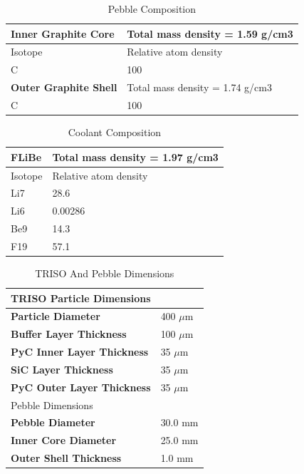 \begin{table}
  \centering
  \begin{tabular}{|ll|}
    \hline \hline
    \textbf{Inner Graphite Core}	& Total mass density = 1.59 g/cm3 \\
    \hline
    Isotope	& Relative atom density \\
    C	& 100 \\
    \hline \hline
    \textbf{Outer Graphite Shell}	& Total mass density = 1.74 g/cm3 \\
    \hline
    C	& 100 \\
    \hline \hline
  \end{tabular}
  \caption{Pebble Composition}
  \label{tab:pebble_comp}
\end{table}


\begin{table}
  \centering
  \begin{tabular}{|ll|}
    \hline \hline
    \textbf{FLiBe}	      & Total mass density = 1.97 g/cm3 \\
    \hline
    Isotope	              & Relative atom density \\
    Li7	                  & 28.6 \\
    Li6	                  & 0.00286 \\
    Be9	                  & 14.3 \\
    F19	                  & 57.1 \\
    \hline \hline
  \end{tabular}
  \caption{Coolant Composition}
  \label{tab:coolant_comp}
\end{table}

\begin{table}
  \centering
  \begin{tabular}{|ll|}
    \hline \hline
    TRISO Particle Dimensions & \\
    \hline
    \textbf{Particle Diameter}	 & 400 $\mu$m \\
    \textbf{Buffer Layer Thickness} & 100 $\mu$m \\
    \textbf{PyC Inner Layer Thickness}	   & 35 $\mu$m \\
    \textbf{SiC Layer Thickness}	   & 35 $\mu$m \\
    \textbf{PyC Outer Layer Thickness}	     & 35 $\mu$m \\
    \hline \hline
    Pebble Dimensions & \\
    \hline
    \textbf{Pebble Diameter} & 30.0 mm \\
    \textbf{Inner Core Diameter} & 25.0 mm \\
    \textbf{Outer Shell Thickness} & 1.0 mm \\
    \hline \hline
  \end{tabular}
  \caption{TRISO And Pebble Dimensions}
  \label{tab:pebble_dims}
\end{table}

